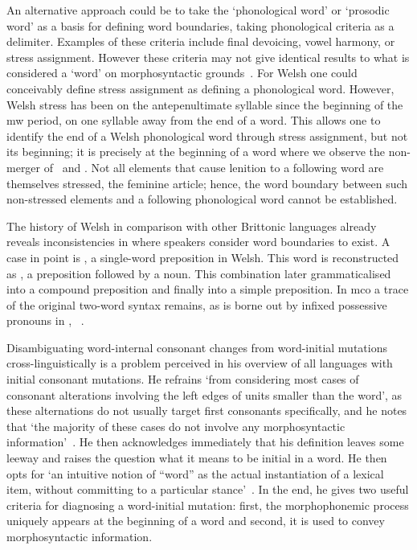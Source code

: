 An alternative approach could be to take the `phonological word' or `prosodic word' as a basis for defining word boundaries, taking phonological criteria as a delimiter. Examples of these criteria include final devoicing, vowel harmony, or stress assignment. However these criteria may not give identical results to what is considered a `word' on morphosyntactic grounds~\autocite[4--5]{haspelmath_indeterminacy_2011}.
For Welsh one could conceivably define stress assignment as defining a phonological word. However, Welsh stress has been on the antepenultimate syllable since the beginning of the \gls{mw} period, \ie on one syllable away from the end of a word. This allows one to identify the end of a Welsh phonological word through stress assignment, but not its beginning; it is precisely at the beginning of a word where we observe the non-merger of \lT\ and \xD. Not all elements that cause lenition to a following word are themselves stressed, \eg the feminine article; hence, the word boundary between such non-stressed elements and a following phonological word cannot be established.

The history of Welsh in comparison with other Brittonic languages already reveals inconsistencies in where speakers consider word boundaries  to exist.
A case in point is , a single-word preposition in Welsh.
This word is reconstructed as  \autocite[258]{schrijver_studies_1995}, a preposition followed by a noun.
This combination later grammaticalised into a compound preposition and finally into a simple preposition.
In \gls{mco} a trace of the original two-word syntax remains, as is borne out by infixed possessive pronouns in , \etc~\autocite[120]{koch_neo-brittonic_1989}.

Disambiguating word-internal consonant changes from word-initial mutations cross-linguistically is  a problem \textcite{iosad_right_2010} perceived in his overview of all languages with initial consonant mutations.
He refrains `from considering most cases of consonant alterations involving the left edges of units smaller than the word', as these alternations do not usually target first consonants specifically, and he notes that `the majority of these cases do not involve any morphosyntactic information'~\autocite[108]{iosad_right_2010}.
He then acknowledges immediately that his definition leaves some leeway and raises the question what it means to be initial in a word.
He then opts for `an intuitive notion of ``word'' as the actual instantiation of a lexical item, without committing to a particular stance'~\autocite[109]{iosad_right_2010}.
In the end, he gives two useful criteria for diagnosing a word-initial mutation: first, the morphophonemic process uniquely appears at the beginning of a word and second, it is used to convey morphosyntactic information.

